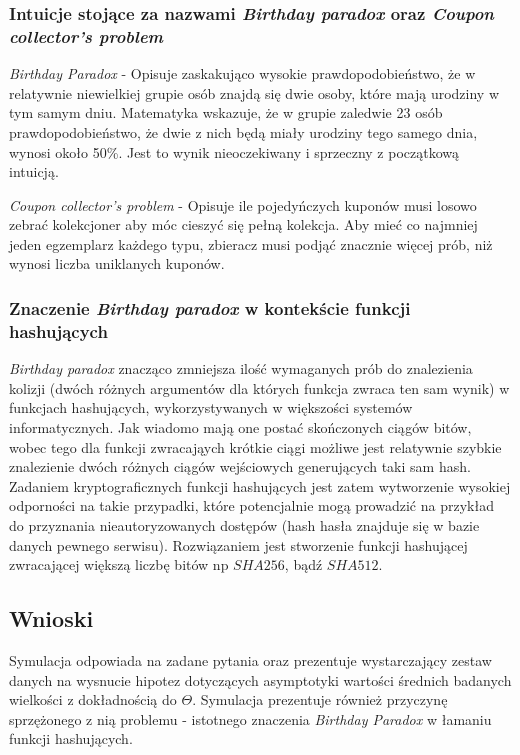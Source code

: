 \documentclass{article}
\begin{document}
\subsubsection{Intuicje stojące za nazwami \textit{Birthday paradox} oraz \textit{Coupon collector's problem}}

\textit{Birthday Paradox} - Opisuje zaskakująco wysokie prawdopodobieństwo, że w relatywnie niewielkiej grupie osób znajdą się dwie osoby, które mają urodziny w tym samym dniu. Matematyka wskazuje, że w grupie zaledwie 23 osób prawdopodobieństwo, że dwie z nich będą miały urodziny tego samego dnia, wynosi około 50\%. Jest to wynik nieoczekiwany i sprzeczny z początkową intuicją.

\textit{Coupon collector's problem} - Opisuje ile pojedyńczych kuponów musi losowo zebrać kolekcjoner aby móc cieszyć się pełną kolekcja. Aby mieć co najmniej jeden egzemplarz każdego typu, zbieracz musi podjąć znacznie więcej prób, niż wynosi liczba uniklanych kuponów.

\subsubsection{Znaczenie \textit{Birthday paradox} w kontekście funkcji hashujących}

\textit{Birthday paradox} znacząco zmniejsza ilość wymaganych prób do znalezienia kolizji (dwóch różnych argumentów dla których funkcja zwraca ten sam wynik) w funkcjach hashujących, wykorzystywanych w większości systemów informatycznych. Jak wiadomo mają one postać skończonych ciągów bitów, wobec tego dla funkcji zwracająych krótkie ciągi możliwe jest relatywnie szybkie znalezienie dwóch różnych ciągów wejściowych generujących taki sam hash. Zadaniem kryptograficznych funkcji hashujących jest zatem wytworzenie wysokiej odporności na takie przypadki, które potencjalnie mogą prowadzić na przykład do przyznania nieautoryzowanych dostępów (hash hasła znajduje się w bazie danych pewnego serwisu). Rozwiązaniem jest stworzenie funkcji hashującej zwracającej większą liczbę bitów np $SHA256$, bądź $SHA512$.

\subsection{Wnioski}

Symulacja odpowiada na zadane pytania oraz prezentuje wystarczający zestaw danych na wysnucie hipotez dotyczących asymptotyki wartości średnich badanych wielkości z dokładnością do $\Theta$. Symulacja prezentuje również przyczynę sprzężonego z nią problemu - istotnego znaczenia \textit{Birthday Paradox} w łamaniu funkcji hashujących.
\end{document}
